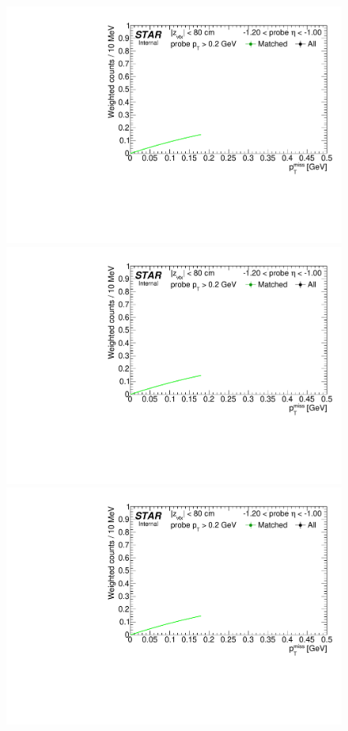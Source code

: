 \begin{figure}[ht]
{}~~~~
\parbox{0.24\textwidth}{
  \centering
  \includegraphics[width=\linewidth,page=6]{graphics/correctionsToEff/TOF_tagAndProbe/Fitting_effVsEta_data.CPT2.pdf}\\
  \includegraphics[width=\linewidth,page=8]{graphics/correctionsToEff/TOF_tagAndProbe/Fitting_effVsEta_data.CPT2.pdf}\\
  \includegraphics[width=\linewidth,page=10]{graphics/correctionsToEff/TOF_tagAndProbe/Fitting_effVsEta_data.CPT2.pdf}

}
\end{figure}
